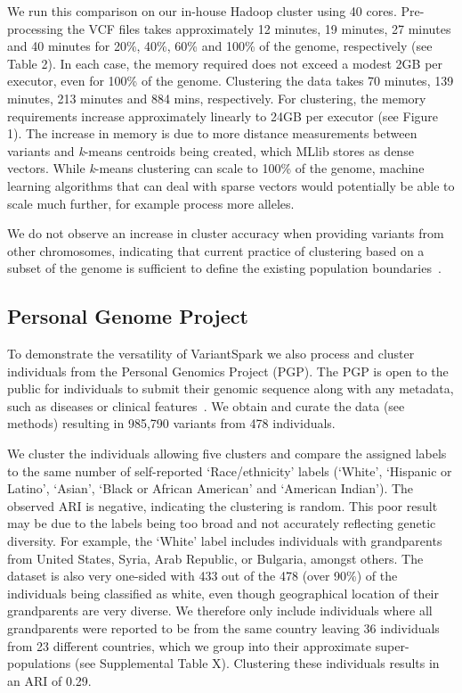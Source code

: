 \documentclass{bmcart}
\newcommand{\variantSpark}{{\sc VariantSpark}}
\newcommand{\kMeans}{\textit{k}-means}
\begin{document}
We run this comparison on our in-house Hadoop cluster using 40 cores.
Pre-processing the VCF files takes approximately 12 minutes, 19 minutes, 27 minutes and 40 minutes for 20\%, 40\%, 60\% and 100\% of the genome, respectively (see Table 2).
In each case, the memory required does not exceed a modest 2GB per executor, even for 100\% of the genome. 
Clustering the data takes 70 minutes, 139 minutes, 213 minutes and 884 mins, respectively.
For clustering, the memory requirements increase approximately linearly to 24GB per executor (see Figure 1). 
The increase in memory is due to more distance measurements between variants and \kMeans{} centroids being created, which MLlib stores as dense vectors. 
While \kMeans{} clustering can scale to 100\% of the genome, machine learning algorithms that can deal with sparse vectors would potentially be able to scale much further, for example process more alleles.

We do not observe an increase in cluster accuracy when providing variants from other chromosomes, indicating that current practice of clustering based on a subset of the genome is sufficient to define the existing population boundaries~\cite{Pugach2015}.


\subsection*{Personal Genome Project}
To demonstrate the versatility of \variantSpark{} we also process and cluster individuals from the Personal Genomics Project (PGP). The PGP is open to the public for individuals to submit their genomic sequence along with any metadata, such as diseases or clinical features~\cite{Lunshof2013}. 
We obtain and curate the data (see methods) resulting in 985,790 variants from 478 individuals.

We cluster the individuals allowing five clusters and compare the assigned labels to the same number of self-reported `Race/ethnicity' labels (`White', `Hispanic or Latino', `Asian', `Black or African American' and `American Indian').
The observed ARI is negative, indicating the clustering is random. 
This poor result may be due to the labels being too broad and not accurately reflecting genetic diversity. For example, the `White' label includes individuals with grandparents from United States, Syria, Arab Republic, or Bulgaria, amongst others. 
The dataset is also very one-sided with 433 out of the 478 (over 90\%) of the individuals being classified as white, even though geographical location of their grandparents are very diverse.
We therefore only include individuals where all grandparents were reported to be from the same country leaving 36 individuals from 23 different countries, which we group into their approximate super-populations (see Supplemental Table X). 
Clustering these individuals results in an ARI of 0.29. 
\end{document}
